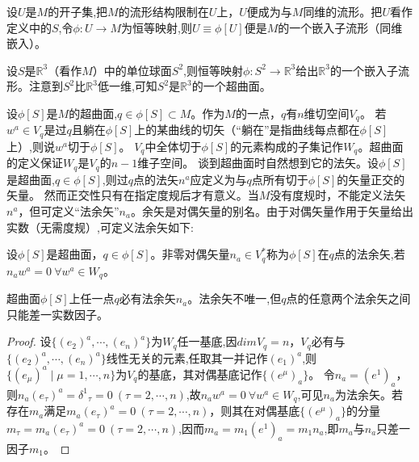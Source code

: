 \begin{example}
	设$U$是$M$的开子集,把$M$的流形结构限制在$U$上，$U$便成为与$M$同维的流形。把$U$看作定义中的$S$,令$\phi \colon U \to M$为恒等映射,则$U \equiv \phi[U]$便是$M$的一个嵌入子流形（同维嵌入）。
\end{example}

\begin{example}
	设$S$是$\mathbb{R}^3$（看作$M$）中的单位球面$S^2$,则恒等映射$\phi \colon S^2 \to \mathbb{R}^3$给出$\mathbb{R}^3$的一个嵌入子流形。注意到$S^2$比$\mathbb{R}^3$低一维,可知$S^2$是$\mathbb{R}^3$的一个超曲面。
\end{example}

设$\phi[S]$是$M$的超曲面,$q \in \phi[S] \subset M$。作为$M$的一点，$q$有$n$维切空间$V_q$。
若$w^a \in V_q$是过$q$且躺在$\phi[S]$上的某曲线的切矢（``躺在''是指曲线每点都在$\phi[S]$上）,则说$w^a$切于$\phi[S]$。
$V_q$中全体切于$\phi[S]$的元素构成的子集记作$W_q$。超曲面的定义保证$W_q$是$V_q$的$n - 1$维子空间。
谈到超曲面时自然想到它的法矢。设$\phi[S]$是超曲面,$q \in \phi[S]$,则过$q$点的法矢$n^a$应定义为与$q$点所有切于$\phi[S]$的矢量正交的矢量。
然而正交性只有在指定度规后才有意义。当$M$没有度规时，不能定义法矢$n^a$，但可定义``法余矢''$n_a$。余矢是对偶矢量的别名。由于对偶矢量作用于矢量给出实数（无需度规）,可定义法余矢如下:

\begin{definition}
	设$\phi[S]$是超曲面，$q \in \phi[S]$。非零对偶矢量$n_a \in V_q^*$称为$\phi[S]$在$q$点的法余矢,若$n_aw^a = 0 ~ \forall w^a \in W_q$。
\end{definition}

\begin{theorem}
	超曲面$\phi[S]$上任一点$q$必有法余矢$n_a$。法余矢不唯一,但$q$点的任意两个法余矢之间只能差一实数因子。
\end{theorem}

\begin{proof}
	设$\{(e_2)^a, \cdots , (e_n)^a\}$为$W_q$任一基底,因$dim V_q = n$，$V_q$必有与$\{(e_2)^a, \cdots , (e_n)^a\}$线性无关的元素,任取其一并记作$(e_1)^a$,则$\{(e_\mu)^a \mid \mu = 1, \cdots, n\}$为$V_q$的基底，其对偶基底记作$\{(e^\mu)_a\}$。
	令$n_a = (e^1)_a$，则$n_a(e_\tau)^a = \delta^1{}_\tau = 0 ~ (\tau = 2, \cdots, n)$,故$n_aw^a = 0 ~ \forall w^a \in W_q$,可见$n_a$为法余矢。若存在$m_a$满足$m_a(e_\tau)^a = 0 ~ (\tau = 2, \cdots, n)$，则其在对偶基底$\{(e^\mu)_a\}$的分量$m_\tau = m_a(e_\tau)^a = 0 ~ (\tau = 2, \cdots, n)$,因而$m_a = m_1(e^1)_a = m_1n_a$,即$m_a$与$n_a$只差一因子$m_1$。
\end{proof}


